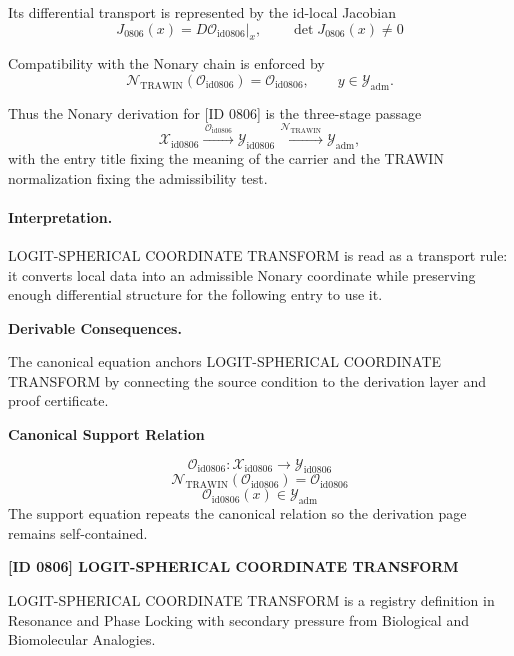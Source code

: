 Its differential transport is represented by the id-local Jacobian\[
J_{0806}(x)=D\mathcal{O}_{\mathrm{id0806}}\big|_x,\qquad \det J_{0806}(x)\neq 0
\]

Compatibility with the Nonary chain is enforced by\[
\mathcal{N}_{\mathrm{TRAWIN}}(\mathcal{O}_{\mathrm{id0806}})=\mathcal{O}_{\mathrm{id0806}},\qquad y\in\mathcal{Y}_{\mathrm{adm}}.
\]

Thus the Nonary derivation for [ID 0806] is the three-stage passage
\[
\mathcal{X}_{\mathrm{id0806}}\xrightarrow{\,\mathcal{O}_{\mathrm{id0806}}\,} \mathcal{Y}_{\mathrm{id0806}}\xrightarrow{\,\mathcal{N}_{\mathrm{TRAWIN}}\,} \mathcal{Y}_{\mathrm{adm}},
\]
with the entry title fixing the meaning of the carrier and the TRAWIN normalization fixing the admissibility test.

\paragraph{Interpretation.} LOGIT-SPHERICAL COORDINATE TRANSFORM is read as a transport rule: it converts local data into an admissible Nonary coordinate while preserving enough differential structure for the following entry to use it.

\par\vspace{0.35em}
\noindent\textbf{Derivable Consequences.}\quad
\begingroup
\footnotesize
\raggedright
The canonical equation anchors LOGIT-SPHERICAL COORDINATE TRANSFORM by connecting the source condition to the derivation layer and proof certificate.
\par\endgroup

\noindent\textbf{Canonical Support Relation}\par
\[
\mathcal{O}_{\mathrm{id0806}}:\mathcal{X}_{\mathrm{id0806}}\longrightarrow\mathcal{Y}_{\mathrm{id0806}}
\]
\[
\mathcal{N}_{\mathrm{TRAWIN}}(\mathcal{O}_{\mathrm{id0806}})=\mathcal{O}_{\mathrm{id0806}}
\]
\[
\mathcal{O}_{\mathrm{id0806}}(x)\in\mathcal{Y}_{\mathrm{adm}}
\]
\noindent The support equation repeats the canonical relation so the derivation page remains self-contained.\par

\clearpage
\noindent\textbf{[ID 0806] LOGIT-SPHERICAL COORDINATE TRANSFORM}\par
\vspace{0.35em}
\begingroup\small
{}
LOGIT-SPHERICAL COORDINATE TRANSFORM is a registry definition in Resonance and Phase Locking with secondary pressure from Biological and Biomolecular Analogies.

